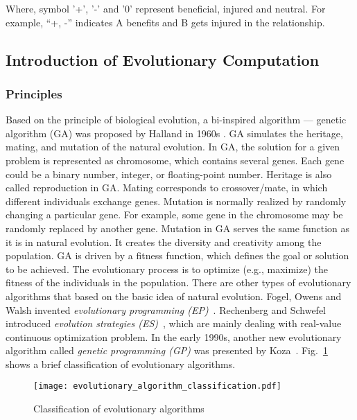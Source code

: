 Where, symbol '+', '-' and '0' represent beneficial, injured and neutral. For example, ``+, -'' indicates A benefits and B gets injured in the relationship.

\subsection{Introduction of Evolutionary Computation}\label{sec:intro_evolutionary_computation}

\subsubsection{Principles}

Based on the principle of biological evolution, a bi-inspired algorithm ---  genetic algorithm (GA) was proposed by Halland in 1960s \cite{Halland_1992}. GA simulates the heritage, mating, and mutation of the natural evolution. In GA, the solution for a given problem is represented as chromosome, which contains several genes. Each gene could be a binary number, integer, or floating-point number. Heritage is also called reproduction in GA. Mating corresponds to crossover/mate, in which different individuals exchange genes. Mutation is normally realized by randomly changing a particular gene. For example, some gene in the chromosome may be randomly replaced by another gene. Mutation in GA serves the same function as it is in natural evolution. It creates the diversity and creativity among the population. GA is driven by a fitness function, which defines the goal or solution to be achieved. The evolutionary process is to optimize (e.g., maximize) the fitness of the individuals in the population. There are other types of evolutionary algorithms that based on the basic idea of natural evolution. Fogel, Owens and Walsh invented \textit{evolutionary programming (EP)}~\cite{Fogel1966}. Rechenberg and Schwefel introduced \textit{evolution strategies (ES)}~\cite{Rechenberg1994}, which are mainly dealing with real-value continuous optimization problem. In the early 1990s, another new evolutionary algorithm called \textit{genetic programming (GP)} was presented by Koza~\cite{Koza1992}. Fig.~\ref{fig:evolutionary_algorithm_classification} shows a brief classification of evolutionary algorithms. 

\begin{figure}[htbp]
  \centering
  \texttt{[image: evolutionary\_algorithm\_classification.pdf]}
  \caption{Classification of evolutionary algorithms}
  \label{fig:evolutionary_algorithm_classification}
\end{figure}

